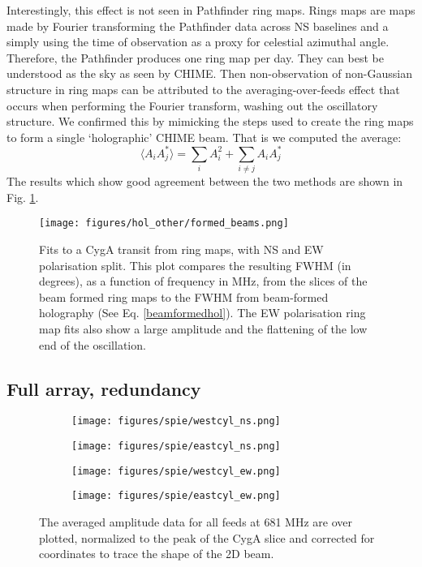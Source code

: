 Interestingly, this effect is not seen in Pathfinder ring maps. Rings maps are maps made by Fourier transforming the Pathfinder data across NS baselines and a simply using the time of observation as a proxy for celestial azimuthal angle. Therefore, the Pathfinder produces one ring map per day. They can best be understood as the sky as seen by CHIME. Then non-observation of non-Gaussian structure in ring maps can be attributed to the averaging-over-feeds effect that occurs when performing the Fourier transform, washing out the oscillatory structure. We confirmed this by mimicking the steps used to create the ring maps to form a single `holographic' CHIME beam. That is we computed the average:
\begin{equation}
\langle A_i A_j^* \rangle = \sum_i A_i^2 + \sum_{i \neq j} A_iA_j^*
\label{beamformedhol}
\end{equation}
The results which show good agreement between the two methods are shown in Fig. \ref{formed_beams}.

\begin{figure}[h!]
\texttt{[image: figures/hol\_other/formed\_beams.png]}
\caption{Fits to a CygA transit from ring maps, with NS and EW polarisation split. This plot compares the resulting FWHM (in degrees), as a function of frequency in MHz, from the slices of the beam formed ring maps to the FWHM from beam-formed holography (See Eq. \ref{beamformedhol}). The EW polarisation ring map fits also show a large amplitude and the flattening of the low end of the oscillation.}
\label{formed_beams}
\end{figure}

\subsection{Full array, redundancy} \label{ch:hol:sec:results:ss:fullarray}

\begin{figure}[h!] %
	\centering
	\begin{subfigure}[b]{0.49\textwidth}
		\texttt{[image: figures/spie/westcyl\_ns.png]}%
	\end{subfigure}
	\begin{subfigure}[b]{0.465\textwidth}
		\texttt{[image: figures/spie/eastcyl\_ns.png]}%
	\end{subfigure}
	\begin{subfigure}[b]{0.49\textwidth}
		\texttt{[image: figures/spie/westcyl\_ew.png]}%
	\end{subfigure}
	\begin{subfigure}[b]{0.46\textwidth}
		\texttt{[image: figures/spie/eastcyl\_ew.png]}%
	\end{subfigure}
\caption{The averaged amplitude data for all feeds at 681 MHz are over plotted, normalized to the peak of the CygA slice and corrected for coordinates to trace the shape of the 2D beam. }
\label{allfeeds}
\end{figure}

